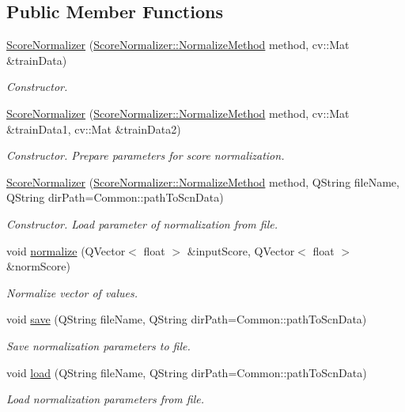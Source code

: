 \subsection*{Public Member Functions}
\begin{DoxyCompactItemize}
\item 
\hyperlink{class_score_normalizer_a5e59a7e51341afb52fb66069db98d118}{Score\+Normalizer} (\hyperlink{class_score_normalizer_a815de463ec815b4dcf8f2919da83c7d6}{Score\+Normalizer\+::\+Normalize\+Method} method, cv\+::\+Mat \&train\+Data)
\begin{DoxyCompactList}\small\item\em Constructor. \end{DoxyCompactList}\item 
\hyperlink{class_score_normalizer_a1595544abaf85e23cb7fc9a43b2a64e9}{Score\+Normalizer} (\hyperlink{class_score_normalizer_a815de463ec815b4dcf8f2919da83c7d6}{Score\+Normalizer\+::\+Normalize\+Method} method, cv\+::\+Mat \&train\+Data1, cv\+::\+Mat \&train\+Data2)
\begin{DoxyCompactList}\small\item\em Constructor. Prepare parameters for score normalization. \end{DoxyCompactList}\item 
\hyperlink{class_score_normalizer_a8567979bc2a004dba862f40c3f82296e}{Score\+Normalizer} (\hyperlink{class_score_normalizer_a815de463ec815b4dcf8f2919da83c7d6}{Score\+Normalizer\+::\+Normalize\+Method} method, Q\+String file\+Name, Q\+String dir\+Path=Common\+::path\+To\+Scn\+Data)
\begin{DoxyCompactList}\small\item\em Constructor. Load parameter of normalization from file. \end{DoxyCompactList}\item 
void \hyperlink{class_score_normalizer_ab7fc9e5c3a05f435776efb33b6b0c2bd}{normalize} (Q\+Vector$<$ float $>$ \&input\+Score, Q\+Vector$<$ float $>$ \&norm\+Score)
\begin{DoxyCompactList}\small\item\em Normalize vector of values. \end{DoxyCompactList}\item 
void \hyperlink{class_score_normalizer_aebed3d0d2db5908c1798271861d3a138}{save} (Q\+String file\+Name, Q\+String dir\+Path=Common\+::path\+To\+Scn\+Data)
\begin{DoxyCompactList}\small\item\em Save normalization parameters to file. \end{DoxyCompactList}\item 
void \hyperlink{class_score_normalizer_a0c18693b8e15d98e40a607dc7e3285fb}{load} (Q\+String file\+Name, Q\+String dir\+Path=Common\+::path\+To\+Scn\+Data)
\begin{DoxyCompactList}\small\item\em Load normalization parameters from file. \end{DoxyCompactList}\end{DoxyCompactItemize}



